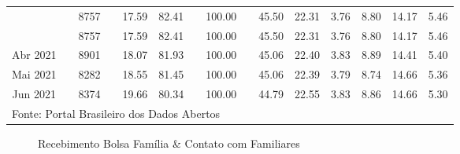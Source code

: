 \documentclass[12pt]{article}
\begin{document}
\begin{landscape}
\begin{table}[htbp]
\begin{adjustbox}{max width=\linewidth}
\begin{tabular}{lllllllllllllll}
    \rowcolor[rgb]{ .851,  .851,  .851} \multicolumn{1}{c}{Fev 2021} &      & \multicolumn{1}{c}{8757} &      & \multicolumn{1}{c}{17.59} & \multicolumn{1}{c}{82.41} &      & \multicolumn{1}{c}{100.00} &      & \multicolumn{1}{c}{45.50} & \multicolumn{1}{c}{22.31} & \multicolumn{1}{c}{3.76} & \multicolumn{1}{c}{8.80} & \multicolumn{1}{c}{14.17} & \multicolumn{1}{c}{5.46} \\
    \rowcolor[rgb]{ .851,  .851,  .851} \multicolumn{1}{c}{Mar 2021} &      & \multicolumn{1}{c}{8757} &      & \multicolumn{1}{c}{17.59} & \multicolumn{1}{c}{82.41} &      & \multicolumn{1}{c}{100.00} &      & \multicolumn{1}{c}{45.50} & \multicolumn{1}{c}{22.31} & \multicolumn{1}{c}{3.76} & \multicolumn{1}{c}{8.80} & \multicolumn{1}{c}{14.17} & \multicolumn{1}{c}{5.46} \\
    \multicolumn{1}{c}{Abr 2021} &      & \multicolumn{1}{c}{8901} &      & \multicolumn{1}{c}{18.07} & \multicolumn{1}{c}{81.93} &      & \multicolumn{1}{c}{100.00} &      & \multicolumn{1}{c}{45.06} & \multicolumn{1}{c}{22.40} & \multicolumn{1}{c}{3.83} & \multicolumn{1}{c}{8.89} & \multicolumn{1}{c}{14.41} & \multicolumn{1}{c}{5.40} \\
    \multicolumn{1}{c}{Mai 2021} &      & \multicolumn{1}{c}{8282} &      & \multicolumn{1}{c}{18.55} & \multicolumn{1}{c}{81.45} &      & \multicolumn{1}{c}{100.00} &      & \multicolumn{1}{c}{45.06} & \multicolumn{1}{c}{22.39} & \multicolumn{1}{c}{3.79} & \multicolumn{1}{c}{8.74} & \multicolumn{1}{c}{14.66} & \multicolumn{1}{c}{5.36} \\
    \multicolumn{1}{c}{Jun 2021} &      & \multicolumn{1}{c}{8374} &      & \multicolumn{1}{c}{19.66} & \multicolumn{1}{c}{80.34} &      & \multicolumn{1}{c}{100.00} &      & \multicolumn{1}{c}{44.79} & \multicolumn{1}{c}{22.55} & \multicolumn{1}{c}{3.83} & \multicolumn{1}{c}{8.86} & \multicolumn{1}{c}{14.66} & \multicolumn{1}{c}{5.30} \\
    \midrule
    \multicolumn{15}{l}{Fonte: Portal Brasileiro dos Dados Abertos} \\
    \end{tabular}%
    \end{adjustbox}
  \label{tab:bf_contato}%
\end{table}%

\end{landscape}

\begin{landscape}
\pagestyle{empty}
\begin{figure}[H]
	\caption{Recebimento Bolsa Família \& Contato com Familiares}
	\qquad
\end{figure}
\end{landscape}
\end{document}
